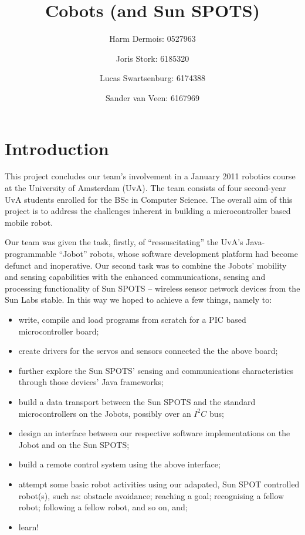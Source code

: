 \documentclass[a4paper, 12pt, titlepage]{article}
\author{Harm Dermois: 0527963\and Joris Stork: 6185320\and Lucas Swartsenburg: 6174388\and Sander van Veen: 6167969}
\title{Cobots (and Sun SPOTS)}
\begin{document}
\maketitle
\tableofcontents
\newpage

\begin{abstract}
\end{abstract}

\section{Introduction}

This project concludes our team's involvement in a January 2011 
robotics course at the University of Amsterdam (UvA). The team consists 
of four second-year UvA students enrolled for the BSc in Computer Science. The
overall aim of this project is to address the challenges inherent in building a
microcontroller based mobile robot.

Our team was given the task, firstly, of ``ressuscitating'' the UvA's
Java-programmable ``Jobot'' robots, whose software development platform 
had become defunct and inoperative. Our second task was to combine the 
Jobots' mobility and sensing capabilities with the enhanced communications, 
sensing and processing functionality of 
Sun SPOTS -- wireless sensor network devices from the Sun Labs
stable. In this way we hoped to achieve a few things, namely to:

\begin{itemize}
    \item write, compile and load programs from scratch for a PIC based
    microcontroller board;
    \item create drivers for the servos and sensors connected the the above
    board;
    \item further explore the Sun SPOTS' sensing and communications
    characteristics through those devices' Java frameworks;
    \item build a data transport between the Sun
    SPOTS and the standard microcontrollers on the Jobots, possibly over 
    an $I^2C$ bus;
    \item design an interface between our respective software implementations
    on the Jobot and on the Sun SPOTS;
    \item build a remote control system using the above interface;
    \item attempt some basic robot activities using our adapated, Sun SPOT
    controlled robot(s), such as: obstacle avoidance; reaching a goal;
    recognising a fellow robot; following a fellow robot, and so on, and;
    \item learn!
\end{itemize}
\end{document}
